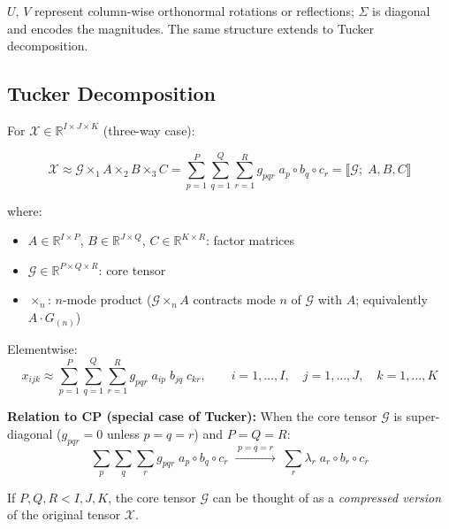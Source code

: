 \documentclass[12pt]{article}
\newcommand{\T}[1]{\mathcal{#1}}   %
\begin{document}
\medskip
\noindent $U$, $V$ represent column-wise orthonormal rotations or reflections;
$\Sigma$ is diagonal and encodes the magnitudes.
The same structure extends to Tucker decomposition.

\subsection{Tucker Decomposition}

For $\T{X} \in \mathbb{R}^{I \times J \times K}$ (three-way case):

\begin{equation}
\T{X} \approx
\T{G} \times_1 A \times_2 B \times_3 C
= \sum_{p=1}^{P}\sum_{q=1}^{Q}\sum_{r=1}^{R}
  g_{pqr}\; a_p \circ b_q \circ c_r
= \llbracket \T{G};\; A, B, C \rrbracket
\end{equation}

where:
\begin{itemize}[itemsep=2pt]
  \item $A \in \mathbb{R}^{I \times P}$, $B \in \mathbb{R}^{J \times Q}$, $C \in \mathbb{R}^{K \times R}$:
        factor matrices
  \item $\T{G} \in \mathbb{R}^{P \times Q \times R}$: core tensor
  \item $\times_n$: $n$-mode product
        ($\T{G} \times_n A$ contracts mode $n$ of $\T{G}$ with $A$; equivalently $A \cdot G_{(n)}$)
\end{itemize}

\noindent Elementwise:
\begin{equation}
x_{ijk} \approx
\sum_{p=1}^{P}\sum_{q=1}^{Q}\sum_{r=1}^{R}
g_{pqr}\; a_{ip}\; b_{jq}\; c_{kr},
\qquad
i=1,\ldots,I,\quad j=1,\ldots,J,\quad k=1,\ldots,K
\end{equation}

\medskip
\noindent\textbf{Relation to CP (special case of Tucker):}
When the core tensor $\T{G}$ is super-diagonal ($g_{pqr}=0$ unless $p=q=r$) and $P=Q=R$:
\begin{equation}
\sum_{p}\sum_{q}\sum_{r} g_{pqr}\; a_p \circ b_q \circ c_r
\;\xrightarrow{\;p=q=r\;}\;
\sum_{r} \lambda_r\; a_r \circ b_r \circ c_r
\end{equation}

\medskip
\noindent If $P, Q, R < I, J, K$, the core tensor $\T{G}$ can be thought of as a
\emph{compressed version} of the original tensor $\T{X}$.
\end{document}
